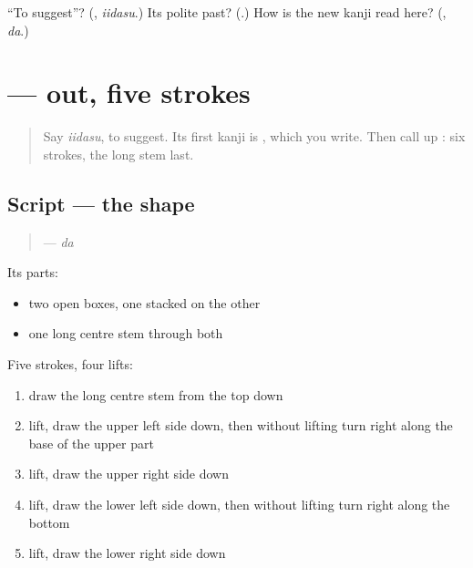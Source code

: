 \begin{tcolorbox}[breakable,colback=teal!4,colframe=teal!35!black,title={Before you move on}]
\textquotedblleft{}To suggest\textquotedblright{}? (\textbf{}, \emph{iidasu}.) Its polite past? (\textbf{}.) How is the new kanji read here? (\textbf{}, \emph{da}.)
\end{tcolorbox}
\section[\texorpdfstring{\ja{出} (da)}{出 (da)}]{ — out, five strokes}

\label{lesson:JA-W254-da-kanji}



\begin{quote}
Say \emph{iidasu}, to suggest. Its first kanji is \textbf{}, which you write. Then call up \textbf{}: six strokes, the long stem last.
\end{quote}

\subsection*{Script — the shape}
\begin{quote}
\textbf{} — \emph{da}
\end{quote}

Its parts:

\begin{itemize}
\raggedright
  \item two open boxes, one stacked on the other
  \item one long centre stem through both
\end{itemize}

Five strokes, four lifts:

\begin{enumerate}
\raggedright
  \item draw the long centre stem from the top down
  \item lift, draw the upper left side down, then without lifting turn right along the base of the upper part
  \item lift, draw the upper right side down
  \item lift, draw the lower left side down, then without lifting turn right along the bottom
  \item lift, draw the lower right side down
\end{enumerate}

